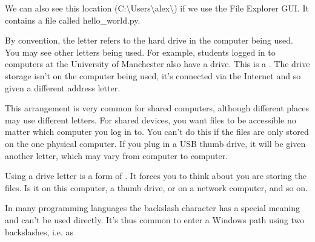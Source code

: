 \documentclass[letterpaper,10pt,british]{sphinxmanual}
\let\sphinxpxdimen\pdfpxdimen\else\newdimen\sphinxpxdimen
\begin{document}
\begin{sphinxVerbatim}[commandchars=\\\{\}]
\end{sphinxVerbatim}

\sphinxAtStartPar
We can also see this location (C:\textbackslash{}Users\textbackslash{}alex\textbackslash{}) if we use the File Explorer GUI. It contains a file called hello\_world.py.

\begin{figure}[htbp]
\centering

\noindent\sphinxincludegraphics[width=800\sphinxpxdimen]{{file_explorer}.png}
\end{figure}

\sphinxAtStartPar
By convention, the letter  refers to the hard drive in the computer being used. You may see other letters being used. For example, students logged in to computers at the University of Manchester also have a  drive. This is a . The  drive storage isn’t on the computer being used, it’s connected via the Internet and so given a different address letter.

\sphinxAtStartPar
This arrangement is very common for shared computers, although different places may use different letters. For shared devices, you want files to be accessible no matter which computer you log in to. You can’t do this if the files are only stored on the one physical computer. If you plug in a USB thumb drive, it will be given another letter, which may vary from computer to computer.

\sphinxAtStartPar
Using a drive letter is a form of . It forces you to think about  you are storing the files. Is it on this computer, a thumb drive, or on a network computer, and so on.

\sphinxAtStartPar
In many programming languages the backslash character  has a special meaning and can’t be used directly. It’s thus common to enter a Windows path using two backslashes, i.e. as

\begin{sphinxVerbatim}[commandchars=\\\{\}]
\end{sphinxVerbatim}
\end{document}
